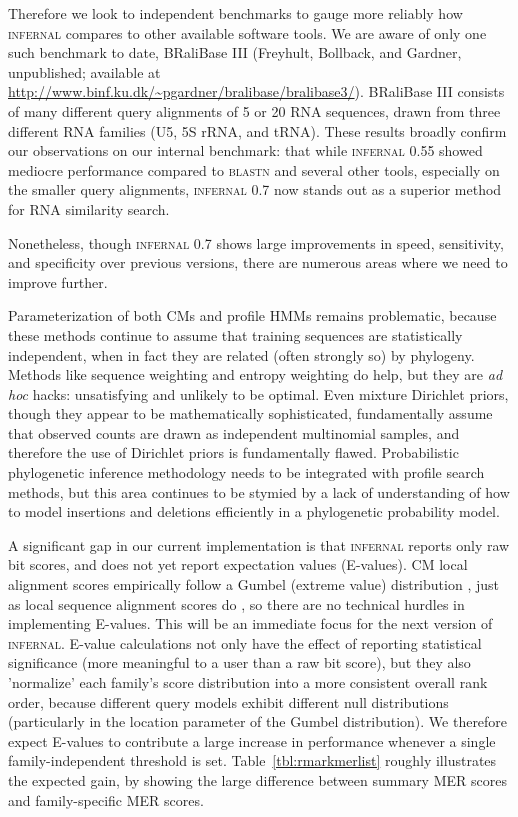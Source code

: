 \documentclass[11pt]{article}
\begin{document}
Therefore we look to independent benchmarks to gauge more reliably how
\textsc{infernal} compares to other available software tools.  We are
aware of only one such benchmark to date, BRaliBase III (Freyhult,
Bollback, and Gardner, unpublished; available at
\url{http://www.binf.ku.dk/~pgardner/bralibase/bralibase3/}). BRaliBase
III consists of many different query alignments of 5 or 20 RNA
sequences, drawn from three different RNA families (U5, 5S rRNA, and
tRNA). These results broadly confirm our observations on our internal
benchmark: that while \textsc{infernal} 0.55 showed mediocre
performance compared to \textsc{blastn} and several other tools,
especially on the smaller query alignments, \textsc{infernal} 0.7 now
stands out as a superior method for RNA similarity search.

Nonetheless, though \textsc{infernal} 0.7 shows large improvements in
speed, sensitivity, and specificity over previous versions, there are
numerous areas where we need to improve further. 

Parameterization of both CMs and profile HMMs remains problematic,
because these methods continue to assume that training sequences are
statistically independent, when in fact they are related (often
strongly so) by phylogeny. Methods like sequence weighting and entropy
weighting do help, but they are \emph{ad hoc} hacks: unsatisfying and
unlikely to be optimal. Even mixture Dirichlet priors, though they
appear to be mathematically sophisticated, fundamentally assume that
observed counts are drawn as independent multinomial samples, and
therefore the use of Dirichlet priors is fundamentally flawed.
Probabilistic phylogenetic inference methodology needs to be
integrated with profile search methods, but this area continues to be
stymied by a lack of understanding of how to model insertions and
deletions efficiently in a phylogenetic probability model.

A significant gap in our current implementation is that
\textsc{infernal} reports only raw bit scores, and does not yet report
expectation values (E-values). CM local alignment scores empirically
follow a Gumbel (extreme value) distribution \cite{KleinEddy03}, just
as local sequence alignment scores do \cite{KarlinAltschul93}, so
there are no technical hurdles in implementing E-values. This will be
an immediate focus for the next version of \textsc{infernal}.  E-value
calculations not only have the effect of reporting statistical
significance (more meaningful to a user than a raw bit score), but
they also 'normalize' each family's score distribution into a more
consistent overall rank order, because different query models exhibit
different null distributions (particularly in the location parameter
of the Gumbel distribution). We therefore expect E-values to
contribute a large increase in performance whenever a single
family-independent threshold is set. Table~\ref{tbl:rmarkmerlist}
roughly illustrates the expected gain, by showing the large difference
between summary MER scores and family-specific MER scores.
\end{document}
